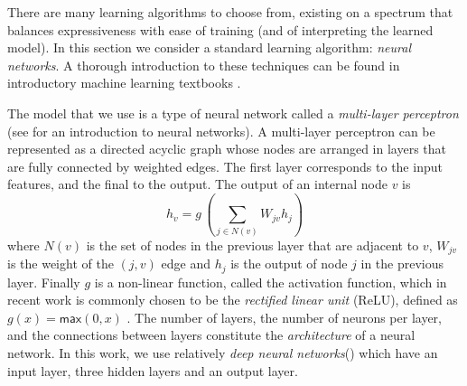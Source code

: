 There are many learning algorithms to choose from, existing on a spectrum that
balances expressiveness with ease of training (and of interpreting the learned
model). In this section we consider a standard learning algorithm: \emph{neural
networks}. A thorough introduction to these techniques can be found in
introductory machine learning textbooks \citep[\eg][]{Hastie2009-bn}.



The model that we use is a type of neural network called a \emph{multi-layer
perceptron} (see \citep{Nielsen2015-pu} for an introduction to neural networks).
A multi-layer perceptron can be represented as a directed acyclic graph whose
nodes are arranged in layers that are fully connected by weighted edges. The
first layer corresponds to the input features, and the final to the output. The
output of an internal node $v$ is
\[ h_v = g\,(\sum_{j \in N(v)}\!W_{jv} h_j ) \] where $N(v)$ is the set of nodes
in the previous layer that are adjacent to $v$, $W_{jv}$ is the weight of the
$(j, v)$ edge and $h_j$ is the output of node $j$ in the previous layer. Finally
$g$ is a non-linear function, called the activation function, which in recent
work is commonly chosen to be the \emph{rectified linear unit} (ReLU), defined
as $g(x) = \mathsf{max}(0,x)$ \citep{Nair2010-xg}. The number of layers, the
number of neurons per layer, and the connections between layers constitute the
\emph{architecture} of a neural network. In this work, we use relatively
\emph{deep neural networks}(\dnn) which have an input layer, three hidden layers and
an output layer.


